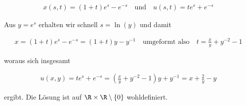 \begin{solution}
\begin{align*}
    x(s,t) = (1 + t) e^s - e^{-s} \quad \text{und} \quad u(s,t) = t e^s + e^{-s}
\end{align*}

Aus $y = e^s$ erhalten wir schnell $s = \ln(y)$ und damit 

\begin{align*}
    x = (1+t) e^s - e^{-s} = (1 + t)y - y^{-1} \quad \text{umgeformt also} \quad t = \frac{x}{y} + y^{-2} - 1 
\end{align*}

woraus sich insgesamt

\begin{align*}
    u(x,y) = t e^s + e^{-s} = \left(\frac{x}{y} + y^{-2} - 1 \right) y + y^{-1} = x + \frac{2}{y} - y
\end{align*}

ergibt.
Die Lösung ist auf $\R \times \R \setminus \{0\}$ wohldefiniert.
\end{solution}

